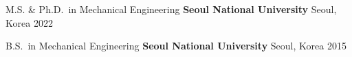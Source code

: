 
\begin{cventries}

  \cventry
    {M.S. \& Ph.D.\ in Mechanical Engineering}
    {\textbf{Seoul National University}}
    {Seoul, Korea}
    {2022}
    {}

  \cventry
    {B.S.\ in Mechanical Engineering}
    {\textbf{Seoul National University}}
    {Seoul, Korea}
    {2015}
    {}

\end{cventries}
